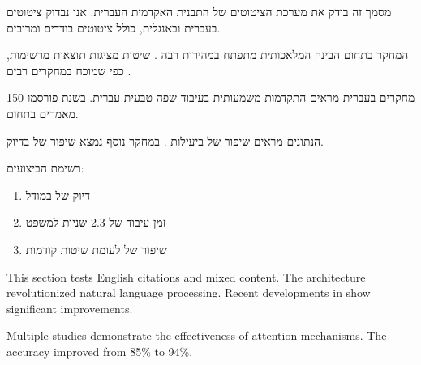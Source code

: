 \documentclass{hebrew-academic-template}
\date{\textenglish{September 2025}}
\begin{document}
\maketitle

\tableofcontents
\newpage



מסמך זה בודק את מערכת הציטוטים של התבנית האקדמית העברית. אנו נבדוק ציטוטים בעברית ובאנגלית, כולל ציטוטים בודדים ומרובים.


המחקר בתחום הבינה המלאכותית מתפתח במהירות רבה \cite{devlin2018bert}. שיטות  מציגות תוצאות מרשימות, כפי שמוכח במחקרים רבים \cite{vaswani2017attention,hebrew_nlp_2023}.

מחקרים בעברית \cite{hebrew_nlp_2023,hebrew_linguistics_2022} מראים התקדמות משמעותית בעיבוד שפה טבעית עברית. בשנת  פורסמו \num{150} מאמרים בתחום.


הנתונים מראים שיפור של  ביעילות \cite{devlin2018bert}. במחקר נוסף \cite{vaswani2017attention} נמצא שיפור של  בדיוק.

רשימת הביצועים:
\begin{enumerate}
    \item דיוק של  במודל  \cite{devlin2018bert}
    \item זמן עיבוד של \num{2.3} שניות למשפט
    \item שיפור של  לעומת שיטות קודמות \cite{hebrew_nlp_2023}
\end{enumerate}



This section tests English citations and mixed content. The  architecture \cite{vaswani2017attention} revolutionized natural language processing. Recent developments in  \cite{devlin2018bert} show significant improvements.

Multiple studies \cite{vaswani2017attention,devlin2018bert,hebrew_nlp_2023} demonstrate the effectiveness of attention mechanisms. The accuracy improved from \num{85}\% to \num{94}\%.
\end{document}
